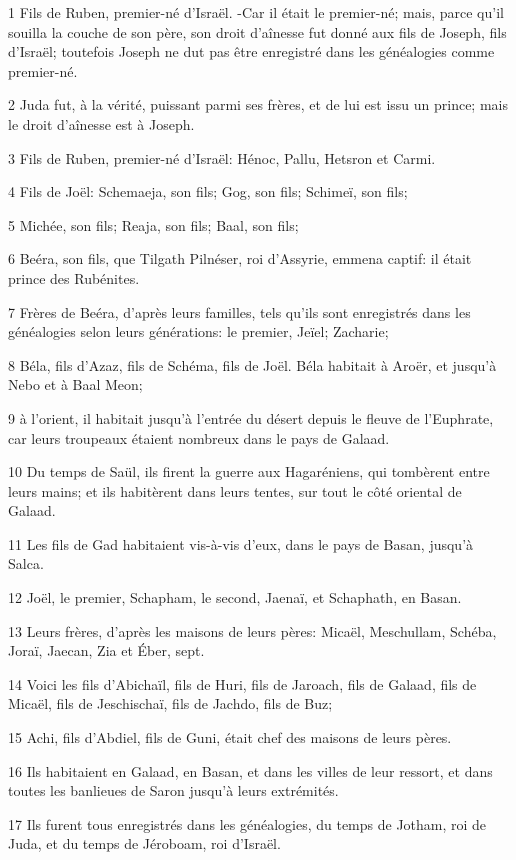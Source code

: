\par 1 Fils de Ruben, premier-né d'Israël. -Car il était le premier-né; mais, parce qu'il souilla la couche de son père, son droit d'aînesse fut donné aux fils de Joseph, fils d'Israël; toutefois Joseph ne dut pas être enregistré dans les généalogies comme premier-né.
\par 2 Juda fut, à la vérité, puissant parmi ses frères, et de lui est issu un prince; mais le droit d'aînesse est à Joseph.
\par 3 Fils de Ruben, premier-né d'Israël: Hénoc, Pallu, Hetsron et Carmi.
\par 4 Fils de Joël: Schemaeja, son fils; Gog, son fils; Schimeï, son fils;
\par 5 Michée, son fils; Reaja, son fils; Baal, son fils;
\par 6 Beéra, son fils, que Tilgath Pilnéser, roi d'Assyrie, emmena captif: il était prince des Rubénites.
\par 7 Frères de Beéra, d'après leurs familles, tels qu'ils sont enregistrés dans les généalogies selon leurs générations: le premier, Jeïel; Zacharie;
\par 8 Béla, fils d'Azaz, fils de Schéma, fils de Joël. Béla habitait à Aroër, et jusqu'à Nebo et à Baal Meon;
\par 9 à l'orient, il habitait jusqu'à l'entrée du désert depuis le fleuve de l'Euphrate, car leurs troupeaux étaient nombreux dans le pays de Galaad.
\par 10 Du temps de Saül, ils firent la guerre aux Hagaréniens, qui tombèrent entre leurs mains; et ils habitèrent dans leurs tentes, sur tout le côté oriental de Galaad.
\par 11 Les fils de Gad habitaient vis-à-vis d'eux, dans le pays de Basan, jusqu'à Salca.
\par 12 Joël, le premier, Schapham, le second, Jaenaï, et Schaphath, en Basan.
\par 13 Leurs frères, d'après les maisons de leurs pères: Micaël, Meschullam, Schéba, Joraï, Jaecan, Zia et Éber, sept.
\par 14 Voici les fils d'Abichaïl, fils de Huri, fils de Jaroach, fils de Galaad, fils de Micaël, fils de Jeschischaï, fils de Jachdo, fils de Buz;
\par 15 Achi, fils d'Abdiel, fils de Guni, était chef des maisons de leurs pères.
\par 16 Ils habitaient en Galaad, en Basan, et dans les villes de leur ressort, et dans toutes les banlieues de Saron jusqu'à leurs extrémités.
\par 17 Ils furent tous enregistrés dans les généalogies, du temps de Jotham, roi de Juda, et du temps de Jéroboam, roi d'Israël.
